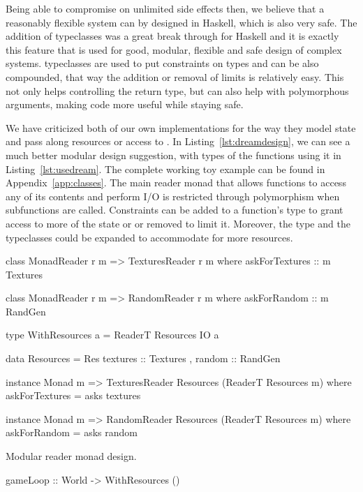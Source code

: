 \documentclass[
  digital, %
  color,   %
  table,   %
  oneside, %
  lof,     %
  lot,     %
]{fithesis3}
\begin{document}
{Being able to compromise on unlimited side effects then, we believe that a reasonably flexible
system can by designed in Haskell, which is also very safe.
The addition of typeclasses was a great break through for Haskell and it is exactly this
feature that is used for good, modular, flexible and safe design of complex systems.
typeclasses are used to put constraints on types and can be also compounded,
that way the addition or removal of limits is relatively easy.
This not only helps controlling the return type, but can also help
with polymorphous arguments, making code more useful while staying safe.

We have criticized both of our own implementations for the way they model state
and pass along resources or access to . In Listing~\ref{lst:dreamdesign},
we can see a much better modular design suggestion, with types of the functions
using it in Listing~\ref{lst:usedream}. The complete working toy example
can be found in Appendix~\ref{app:classes}.
The main reader monad  that allows functions
to access any of its contents and perform I/O
is restricted through polymorphism when subfunctions are called.
Constraints can be added to a function's type to grant access to more of the state or
or removed to limit it. Moreover, the  type and the typeclasses
could be expanded to accommodate for more resources.

\begin{listing}
\begin{haskell}
class MonadReader r m => TexturesReader r m where
    askForTextures :: m Textures

class MonadReader r m => RandomReader r m where
    askForRandom :: m RandGen

type WithResources a = ReaderT Resources IO a

data Resources =
    Res
    { textures :: Textures
    , random   :: RandGen
    }

instance Monad m => TexturesReader Resources (ReaderT Resources m) where
    askForTextures = asks textures

instance Monad m => RandomReader Resources (ReaderT Resources m) where
    askForRandom = asks random
\end{haskell}
\caption{Modular reader monad design.}
\label{lst:dreamdesign}
\end{listing}

\begin{listing}
\begin{haskell}
gameLoop :: World -> WithResources ()


\end{haskell}
\end{listing}}
\end{document}

